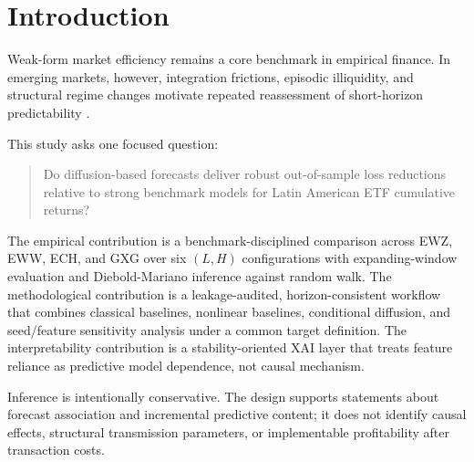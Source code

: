 \section{Introduction}

Weak-form market efficiency remains a core benchmark in empirical finance. In emerging markets, however, integration frictions, episodic illiquidity, and structural regime changes motivate repeated reassessment of short-horizon predictability \parencite{fama1970,fama1991,harvey1995,bekaertharvey1995}.

This study asks one focused question:
\begin{quote}
Do diffusion-based forecasts deliver robust out-of-sample loss reductions relative to strong benchmark models for Latin American ETF cumulative returns?
\end{quote}

The empirical contribution is a benchmark-disciplined comparison across EWZ, EWW, ECH, and GXG over six $(L,H)$ configurations with expanding-window evaluation and Diebold-Mariano inference against random walk. The methodological contribution is a leakage-audited, horizon-consistent workflow that combines classical baselines, nonlinear baselines, conditional diffusion, and seed/feature sensitivity analysis under a common target definition. The interpretability contribution is a stability-oriented XAI layer that treats feature reliance as predictive model dependence, not causal mechanism.

Inference is intentionally conservative. The design supports statements about forecast association and incremental predictive content; it does not identify causal effects, structural transmission parameters, or implementable profitability after transaction costs.
